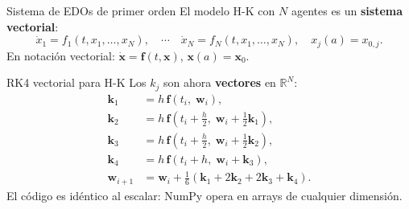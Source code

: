 \documentclass[aspectratio=169,10pt]{beamer}
\newcommand{\R}{\mathbb{R}}
\begin{document}
\begin{frame}{Sistema de EDOs de primer orden}
\vspace{4pt}
El modelo H-K con $N$ agentes es un \textbf{sistema vectorial}:
\[
  \dot{x}_1 = f_1(t,x_1,\ldots,x_N),
  \quad \cdots \quad
  \dot{x}_N = f_N(t,x_1,\ldots,x_N),
  \quad x_j(a) = x_{0,j}.
\]
En notaci\'on vectorial:
$\dot{\mathbf{x}}=\mathbf{f}(t,\mathbf{x})$,\;
$\mathbf{x}(a)=\mathbf{x}_0$.

\vspace{8pt}
\begin{resultbox}{RK4 vectorial para H-K}
Los $k_j$ son ahora \textbf{vectores} en $\R^N$:
\begin{align*}
  \mathbf{k}_1 &= h\,\mathbf{f}(t_i,\;\mathbf{w}_i), \\
  \mathbf{k}_2 &= h\,\mathbf{f}\!\left(t_i+\tfrac{h}{2},\;
                   \mathbf{w}_i+\tfrac{1}{2}\mathbf{k}_1\right), \\
  \mathbf{k}_3 &= h\,\mathbf{f}\!\left(t_i+\tfrac{h}{2},\;
                   \mathbf{w}_i+\tfrac{1}{2}\mathbf{k}_2\right), \\
  \mathbf{k}_4 &= h\,\mathbf{f}\!\left(t_i+h,\;
                   \mathbf{w}_i+\mathbf{k}_3\right), \\
  \mathbf{w}_{i+1} &= \mathbf{w}_i
      + \tfrac{1}{6}(\mathbf{k}_1+2\mathbf{k}_2+2\mathbf{k}_3+\mathbf{k}_4).
\end{align*}
\textcolor{textgray}{\small
El c\'odigo es id\'entico al escalar: NumPy opera en arrays de cualquier dimensi\'on.}
\end{resultbox}
\end{frame}
\end{document}
